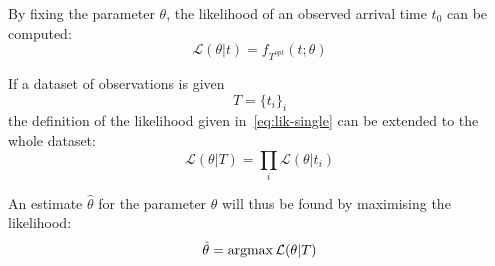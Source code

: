 By fixing the parameter \(\theta\),
the likelihood of an observed arrival time \(t_0\) can be computed:
\begin{equation}
  \label{eq:lik-single}
  \mathcal{L}(\theta | t) = f_{T^{opt}}(t; \theta)
\end{equation}

If a dataset of observations is given
\begin{equation*}
  T = \{t_i\}_i
\end{equation*}
the definition of the likelihood given in~\eqref{eq:lik-single} can be extended to the whole dataset:
\begin{equation}
  \label{eq:lik-final}
  \mathcal{L}(\theta | T) = \prod_i \mathcal{L}(\theta | t_i)
\end{equation}

An estimate \(\hat{\theta}\) for the parameter \(\theta\) will thus be found by maximising the likelihood:
\begin{equation}
  \label{eq:max-lik}
  \hat{\theta} = \operatorname*{argmax} \mathcal{L}(\theta | T)
\end{equation}

